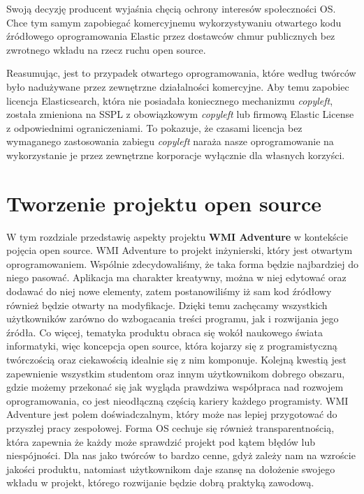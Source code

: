 \documentclass{article}
\begin{document}
Swoją decyzję producent wyjaśnia chęcią ochrony interesów społeczności OS. Chce tym samym zapobiegać komercyjnemu wykorzystywaniu otwartego kodu źródłowego oprogramowania Elastic przez dostawców chmur publicznych bez zwrotnego wkładu na rzecz ruchu open source\cite{linux.polska}.

Reasumując, jest to przypadek otwartego oprogramowania, które według twórców było nadużywane przez zewnętrzne działalności komercyjne. Aby temu zapobiec licencja Elasticsearch, która nie posiadała koniecznego mechanizmu \emph{copyleft}, została zmieniona na SSPL z obowiązkowym \emph{copyleft} lub firmową Elastic License z odpowiednimi ograniczeniami. To pokazuje, że czasami licencja bez wymaganego zastosowania zabiegu \emph{copyleft} naraża nasze oprogramowanie na wykorzystanie je przez zewnętrzne korporacje wyłącznie dla własnych korzyści. 

\section{Tworzenie projektu open source}

\hspace{4mm} W tym rozdziale przedstawię aspekty projektu \textbf{WMI Adventure} w kontekście pojęcia open source. WMI Adventure to projekt inżynierski, który jest otwartym oprogramowaniem. Wspólnie zdecydowaliśmy, że taka forma będzie najbardziej do niego pasować. Aplikacja ma charakter kreatywny, można w niej edytować oraz dodawać do niej nowe elementy, zatem postanowiliśmy iż sam kod źródłowy również będzie otwarty na modyfikacje. Dzięki temu zachęcamy wszystkich użytkowników zarówno do wzbogacania treści programu, jak i rozwijania jego źródła. Co więcej, tematyka produktu obraca się wokół naukowego świata informatyki, więc koncepcja open source, która kojarzy się z programistyczną twórczością oraz ciekawością idealnie się z nim komponuje. Kolejną kwestią jest zapewnienie wszystkim studentom oraz innym użytkownikom dobrego obszaru, gdzie możemy przekonać się jak wygląda prawdziwa współpraca nad rozwojem oprogramowania, co jest nieodłączną częścią kariery każdego programisty. WMI Adventure jest polem doświadczalnym, który może nas lepiej przygotować do przyszłej pracy zespołowej. Forma OS cechuje się również transparentnością, która zapewnia że każdy może sprawdzić projekt pod kątem błędów lub niespójności. Dla nas jako twórców to bardzo cenne, gdyż zależy nam na wzroście jakości produktu, natomiast użytkownikom daje szansę na dołożenie swojego wkładu w projekt, którego rozwijanie będzie dobrą praktyką zawodową.
\end{document}
